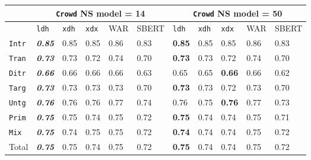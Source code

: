 \documentclass[xcolor={dvipsnames}]{beamer}
\newcommand{\feat}[1]{\textsc{#1}}
\newcommand{\param}[1]{\texttt{#1}}
\begin{document}
\begin{frame}
\begin{table}[htb!]
\begin{center}
\setlength{\tabcolsep}{.35em}
\begin{tabular}{|l||l|l|l||l|l||l|l|l||l|l|}
\hline
 & \multicolumn{5}{c||}{\param{Crowd} NS model = 14} & \multicolumn{5}{c|}{\param{Crowd} NS model = 50} \\
\hline
    		& \param{ldh}	& \param{xdh} &	\param{xdx} & WAR	& {\scriptsize SBERT} & \param{ldh}	& \param{xdh} &	\param{xdx} & WAR	& {\scriptsize SBERT} \\ \hline
\hline
\param{Intr}   & \textbf{\textit{0.85}} & 0.85 & 0.85 & 0.86 & 0.83  & \textbf{0.85} & 0.85 & 0.85 & 0.86 & 0.83 \\ \hline
\param{Tran}    & \textit{\textbf{0.73}} & 0.73 & 0.72 & 0.74 & 0.70   & \textbf{0.73} & 0.73 & 0.72 & 0.74 & 0.70 \\ \hline
\param{Ditr}    & \textit{\textbf{0.66}} & 0.66 & 0.66 & 0.66 & 0.63  & 0.65 & 0.65 & \textbf{0.66} & 0.66 & 0.62 \\ \hline
\hline
\param{Targ}    & \textit{\textbf{0.73}} & 0.73 & 0.73 & 0.73 & 0.70  & \textbf{0.73} & 0.73 & 0.72 & 0.73 & 0.70 \\ \hline
\param{Untg}    & \textit{\textbf{0.76}} & 0.76 & 0.76 & 0.77 & 0.74  & 0.76 & 0.75 & \textbf{0.76} & 0.77 & 0.73 \\ \hline
\hline
\param{Prim}    & \textit{\textbf{0.75}} & 0.75 & 0.74 & 0.75 & 0.72  & \textbf{0.75} & 0.74 & 0.74 & 0.75 & 0.71 \\ \hline
\param{Mix}      & \textit{\textbf{0.75}} & 0.74 & 0.75 & 0.75 & 0.72  & \textbf{0.74} & 0.74 & 0.74 & 0.75 & 0.72 \\ \hline
\hline
Total 	 & \textit{\textbf{0.75}} & 0.75 & 0.74 & 0.75 & 0.72 	& \textbf{0.75} & 0.74 & 0.74 & 0.75 & 0.72 \\ \hline
\end{tabular}
\end{center}
\end{table}


\end{frame}
\end{document}
